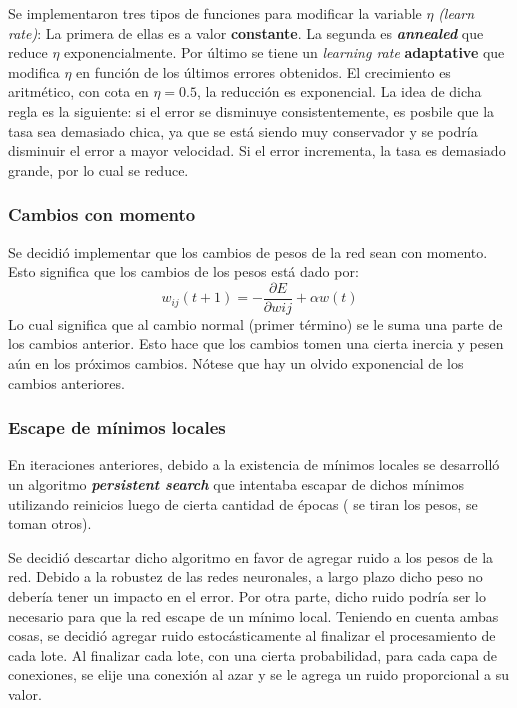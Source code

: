 \documentclass[%
    final,
    reprint,
    notitlepage,
    narroweqnarray,
    inline,
    twoside,
    invited
    ]{ieee}
\begin{document}
\par Se implementaron tres tipos de funciones para modificar la variable $\eta$ \textit{(learn rate)}: 
La primera de ellas es a valor \textbf{constante}. La segunda es \textbf{\textit{annealed}} que reduce $\eta$ exponencialmente.
Por último se tiene un \textit{learning rate} \textbf{adaptative} que modifica $\eta$ en función de los últimos errores obtenidos. 
El crecimiento es aritmético, con cota en $\eta =0.5$, la reducción es exponencial. La idea de dicha regla es la siguiente: 
si el error se disminuye consistentemente, es posbile que la tasa sea demasiado chica, ya que se está siendo muy conservador 
y se podría disminuir el error a mayor velocidad. Si el error incrementa, la tasa es demasiado grande, por lo cual se reduce.\\

\subsubsection{Cambios con momento}

\par Se decidió implementar que los cambios de pesos de la red sean con momento. Esto significa que los cambios de los 
pesos está dado por:
\[w_{ij}(t+1)= - \frac{\partial E}{\partial w{ij}} + \alpha w(t)\]
Lo cual significa que al cambio normal (primer término) se le suma una parte de los cambios anterior. Esto hace 
que los cambios tomen una cierta inercia y pesen aún en los próximos cambios. Nótese que hay un olvido exponencial 
de los cambios anteriores.
\subsubsection{Escape de mínimos locales}

\par En iteraciones anteriores, debido a la existencia de mínimos locales se desarrolló un algoritmo  
\textbf{\textit{persistent search}} que intentaba 
escapar de dichos mínimos utilizando reinicios luego de cierta cantidad de épocas ( se tiran los pesos, se toman otros).
\par Se decidió descartar dicho algoritmo en favor de agregar ruido a los pesos de la red. Debido a la robustez de 
las redes neuronales, a largo plazo dicho peso no debería tener un impacto en el error. Por otra parte, dicho 
ruido podría ser lo necesario para que la red escape de un mínimo local. Teniendo en cuenta ambas cosas, se decidió
agregar ruido estocásticamente al finalizar el procesamiento de cada lote. Al finalizar cada lote, con una cierta probabilidad, 
para cada capa de conexiones, se elije una conexión al azar y se le agrega un ruido proporcional a su valor.
\end{document}
